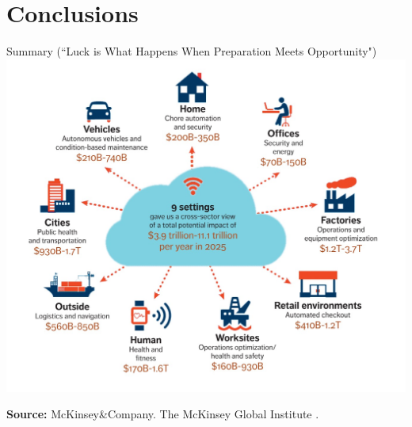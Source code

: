 \documentclass[aspectratio=43]{beamer}
\begin{document}
\section{Conclusions}

\begin{frame}{Summary (``Luck is What Happens When Preparation Meets Opportunity")}
    \centering 
    \includegraphics[width=\textwidth, height= 0.77\textheight, keepaspectratio, frame]{Figures/McKinsey-Global-Institute_IoT.jpg} 
    
    \tiny{\textbf{Source:} McKinsey\&Company. The McKinsey Global Institute \cite{mckinsey2015}.}
\end{frame}
\end{document}
